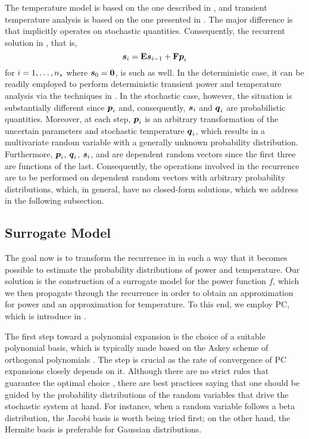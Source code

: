 The temperature model is based on the one described in ,
and transient temperature analysis is based on the one presented in
. The major difference is that
 implicitly operates on stochastic quantities.
Consequently, the recurrent solution in , that
is,
\begin{equation} \elab{chaos-recurrence-original}
  \vs_i = \m{E} \vs_{i - 1} + \m{F} \vp_i
\end{equation}
for $i = 1, \dots, {n_{s}}$ where $\boldsymbol{s}_0 = \boldsymbol{0}$, is such as well. In the
deterministic case, it can be readily employed to perform deterministic
transient power and temperature analysis via the techniques in
. In the stochastic case, however, the
situation is substantially different since $\boldsymbol{p}_i$ and, consequently, $\boldsymbol{s}_i$
and $\boldsymbol{q}_i$ are probabilistic quantities. Moreover, at each step, $\boldsymbol{p}_i$ is an
arbitrary transformation of the uncertain parameters \vu and stochastic
temperature $\boldsymbol{q}_i$, which results in a multivariate random variable with a
generally unknown probability distribution. Furthermore, $\boldsymbol{p}_i$, $\boldsymbol{q}_i$,
$\boldsymbol{s}_i$, and \vu are dependent random vectors since the first three are
functions of the last. Consequently, the operations involved in the recurrence
are to be performed on dependent random vectors with arbitrary probability
distributions, which, in general, have no closed-form solutions, which we
address in the following subsection.

\subsection{Surrogate Model}

The goal now is to transform the recurrence in 
in such a way that it becomes possible to estimate the probability distributions
of power and temperature. Our solution is the construction of a surrogate model
for the power function $f$, which we then propagate through the recurrence in
order to obtain an approximation for power and an approximation for temperature.
To this end, we employ \ac{PC}, which is introduce in .

The first step toward a polynomial expansion is the choice of a suitable
polynomial basis, which is typically made based on the Askey scheme of
orthogonal polynomials \cite{xiu2010}. The step is crucial as the rate of
convergence of \ac{PC} expansions closely depends on it. Although there are no
strict rules that guarantee the optimal choice \cite{knio2006}, there are best
practices saying that one should be guided by the probability distributions of
the random variables that drive the stochastic system at hand. For instance,
when a random variable follows a beta distribution, the Jacobi basis is worth
being tried first; on the other hand, the Hermite basis is preferable for
Gaussian distributions.

